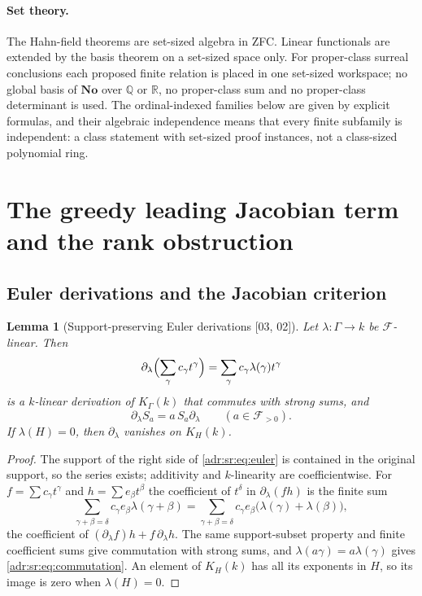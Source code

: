\documentclass[11pt,letterpaper]{article}
\numberwithin{equation}{section}
\newtheorem{lemma}[lemma]{Lemma}
\theoremstyle{definition}
\theoremstyle{remark}
\newcommand{\No}{\mathbf{No}}
\newcommand{\R}{\mathbb R}
\newcommand{\Q}{\mathbb Q}
\newcommand{\K}{K_\Gamma(k)}
\newcommand{\src}[1]{\textup{[#1]}}%
\begin{document}
\paragraph{Set theory.} The Hahn-field theorems are set-sized algebra in ZFC.
Linear functionals are extended by the basis theorem on a set-sized space
only. For proper-class surreal conclusions each proposed finite relation is
placed in one set-sized workspace; no global basis of $\No$ over $\Q$ or $\R$,
no proper-class sum and no proper-class determinant is used. The
ordinal-indexed families below are given by explicit formulas, and their
algebraic independence means that every finite subfamily is independent: a
class statement with set-sized proof instances, not a class-sized polynomial
ring.

\section{The greedy leading Jacobian term and the rank obstruction}
\label{adr:sr:sec:rank}

\subsection{Euler derivations and the Jacobian criterion}

\begin{lemma}[Support-preserving Euler derivations \src{03, 02}]
\label{adr:sr:lem:euler}
Let $\lambda:\Gamma\to k$ be $\mathcal F$-linear. Then
\begin{equation}\label{adr:sr:eq:euler}
 \partial_\lambda\Bigl(\sum_\gamma c_\gamma t^\gamma\Bigr)
   =\sum_\gamma c_\gamma\lambda(\gamma)t^\gamma
\end{equation}
is a $k$-linear derivation of $\K$ that commutes with strong sums, and
\begin{equation}\label{adr:sr:eq:commutation}
 \partial_\lambda S_a=a\,S_a\partial_\lambda\qquad(a\in\mathcal F_{>0}).
\end{equation}
If $\lambda(H)=0$, then $\partial_\lambda$ vanishes on $K_H(k)$.
\end{lemma}
\begin{proof}
The support of the right side of \eqref{adr:sr:eq:euler} is contained in the
original support, so the series exists; additivity and $k$-linearity are
coefficientwise. For $f=\sum c_\gamma t^\gamma$ and $h=\sum e_\beta t^\beta$
the coefficient of $t^\delta$ in $\partial_\lambda(fh)$ is the finite sum
\[
 \sum_{\gamma+\beta=\delta}c_\gamma e_\beta\lambda(\gamma+\beta)
 =\sum_{\gamma+\beta=\delta}c_\gamma e_\beta\bigl(\lambda(\gamma)+\lambda(\beta)\bigr),
\]
the coefficient of $(\partial_\lambda f)h+f\,\partial_\lambda h$. The same
support-subset property and finite coefficient sums give commutation with
strong sums, and $\lambda(a\gamma)=a\lambda(\gamma)$ gives
\eqref{adr:sr:eq:commutation}. An element of $K_H(k)$ has all its exponents in
$H$, so its image is zero when $\lambda(H)=0$.
\end{proof}
\end{document}
